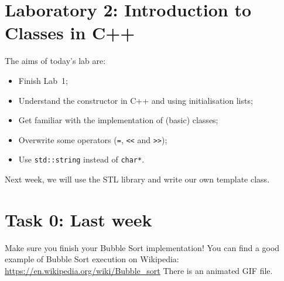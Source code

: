 
\section*{Laboratory 2: Introduction to Classes in C++}

%
%
%
%    
%    

The aims of today's lab are:
\begin{itemize}
\item Finish Lab~1; %
\item Understand the constructor in C++ and using initialisation lists;
\item Get familiar with the implementation of (basic) classes;
\item Overwrite some operators (\verb+=+, \verb+<<+ and \verb+>>+);
\item Use \verb+std::string+ instead of \verb+char*+.
\end{itemize}

Next week, we will use the STL library and write our own template class.

\section*{Task 0: Last week}

Make sure you finish your Bubble Sort implementation!
You can find a good example of Bubble Sort execution on Wikipedia:
\url{https://en.wikipedia.org/wiki/Bubble_sort}
There is an animated GIF file.

